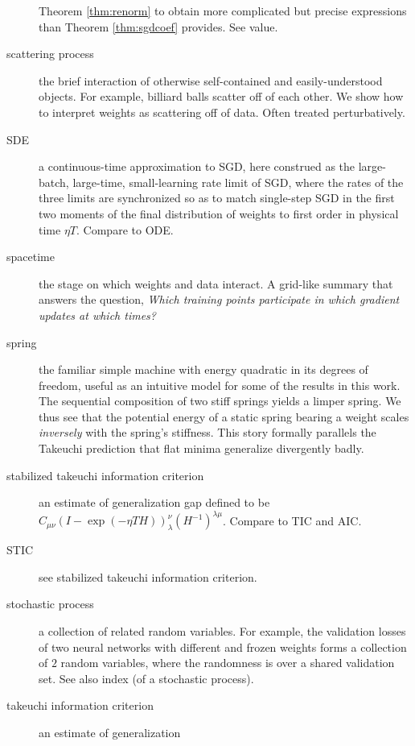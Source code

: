 \documentclass{article}
\theoremstyle{plain}
\theoremstyle{definition}
\newcommand{\wrap}[1]{\left(#1\right)}
\begin{document}
\begin{description}
            Theorem \ref{thm:renorm} to obtain more complicated but precise
            expressions than Theorem \ref{thm:sgdcoef} provides.  See value.
        \item[scattering process] the brief interaction of otherwise
            self-contained and easily-understood objects.  For example,
            billiard balls scatter off of each other.  We show how to interpret
            weights as scattering off of data.  Often treated perturbatively. 
        \item[SDE] a continuous-time approximation to SGD, here construed as
            the large-batch, large-time, small-learning rate limit of SGD,
            where the rates of the three limits are synchronized so as to match
            single-step SGD in the first two moments of the final distribution
            of weights to first order in physical time $\eta T$.  Compare to
            ODE.
        \item[spacetime] the stage on which weights and data interact.  A
            grid-like summary that answers the question, \emph{Which training
            points participate in which gradient updates at which times?}
        \item[spring] the familiar simple machine with energy quadratic in its
            degrees of freedom, useful as an intuitive model for some of the
            results in this work.  The sequential composition of two stiff
            springs yields a limper spring.  We thus see that the potential
            energy of a static spring bearing a weight scales \emph{inversely}
            with the spring's stiffness.  This story formally parallels the
            Takeuchi prediction that flat minima generalize divergently badly.
        \item[stabilized takeuchi information criterion] an estimate of
            generalization gap defined to be $C_{\mu\nu}\wrap{ I - \exp(-\eta T
            H) }^{\nu}_{\lambda}\wrap{H^{-1}}^{\lambda\mu}$.  Compare to
            TIC and AIC.
        \item[STIC] see stabilized takeuchi information criterion.
        \item[stochastic process] a collection of related random variables.
            For example, the validation losses of two neural networks with
            different and frozen weights forms a collection of $2$ random
            variables, where the randomness is over a shared validation set.
            See also index (of a stochastic process).
        \item[takeuchi information criterion] an estimate of generalization

\end{description}
\end{document}
